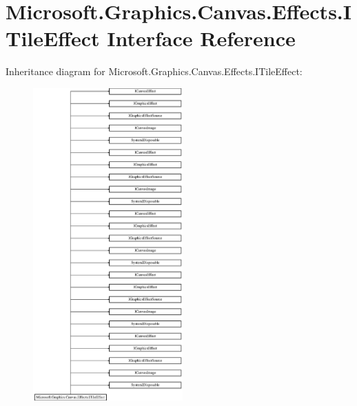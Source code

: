 \hypertarget{interface_microsoft_1_1_graphics_1_1_canvas_1_1_effects_1_1_i_tile_effect}{}\section{Microsoft.\+Graphics.\+Canvas.\+Effects.\+I\+Tile\+Effect Interface Reference}
\label{interface_microsoft_1_1_graphics_1_1_canvas_1_1_effects_1_1_i_tile_effect}
Inheritance diagram for Microsoft.\+Graphics.\+Canvas.\+Effects.\+I\+Tile\+Effect\+:\begin{figure}[H]
\begin{center}
\leavevmode
\includegraphics[height=12.000000cm]{interface_microsoft_1_1_graphics_1_1_canvas_1_1_effects_1_1_i_tile_effect}
\end{center}
\end{figure}

